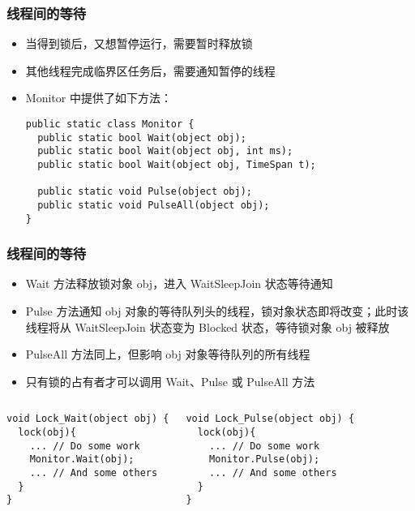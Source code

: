 
\begin{frame}[fragile]
\frametitle{线程间的等待}
\begin{itemize}
\item 当得到锁后，又想暂停运行，需要暂时释放锁
\item 其他线程完成临界区任务后，需要通知暂停的线程
\item Monitor 中提供了如下方法：
\begin{lstlisting}
public static class Monitor {
  public static bool Wait(object obj);
  public static bool Wait(object obj, int ms);
  public static bool Wait(object obj, TimeSpan t);
  
  public static void Pulse(object obj);
  public static void PulseAll(object obj);
}
\end{lstlisting}
\end{itemize}

\end{frame}

\begin{frame}[fragile]
\frametitle{线程间的等待}
\begin{itemize}
\setlength{\itemsep}{6pt plus 1pt}
\item Wait 方法释放锁对象 obj，进入 WaitSleepJoin 状态等待通知
\item Pulse 方法通知 obj 对象的等待队列头的线程，锁对象状态即将改变；此时该线程将从 WaitSleepJoin
  状态变为 Blocked 状态，等待锁对象 obj 被释放
\item PulseAll 方法同上，但影响 obj 对象等待队列的所有线程
\item 只有锁的占有者才可以调用 Wait、Pulse 或 PulseAll 方法
\end{itemize}
\begin{columns}
\begin{lstlisting}
void Lock_Wait(object obj) {
  lock(obj){
    ... // Do some work
    Monitor.Wait(obj);
    ... // And some others
  }
}
\end{lstlisting}
\begin{lstlisting}
void Lock_Pulse(object obj) {
  lock(obj){
    ... // Do some work
    Monitor.Pulse(obj);
    ... // And some others
  }
}
\end{lstlisting}
\end{columns}
\end{frame}


